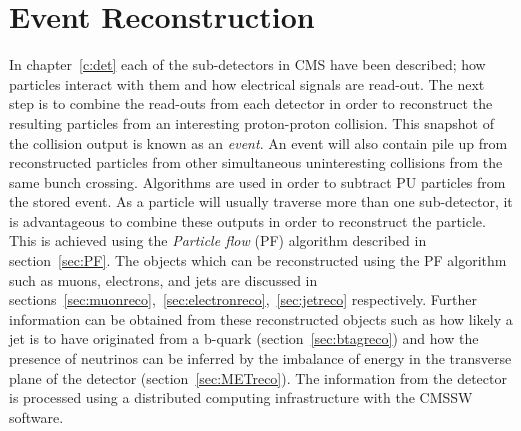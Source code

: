 \chapter{Event Reconstruction}
\label{c:recon}


In chapter~\ref{c:det} each of the sub-detectors in CMS have been described; how particles interact with them and how electrical signals are read-out. The next step is to combine the read-outs from each detector in order to reconstruct the resulting particles from an interesting proton-proton collision. This snapshot of the collision output is known as an \emph{event}. An event will also contain pile up from reconstructed particles from other simultaneous uninteresting collisions from the same bunch crossing. Algorithms are used in order to subtract PU particles from the stored event. 
As a particle will usually traverse more than one sub-detector, it is advantageous to combine these outputs in order to reconstruct the particle. This is achieved using the \emph{Particle flow} (PF) algorithm described in section~\ref{sec:PF}. The objects which can be reconstructed using the PF algorithm such as muons, electrons, and jets are discussed in sections~\ref{sec:muonreco},~\ref{sec:electronreco},~\ref{sec:jetreco} respectively. Further information can be obtained from these reconstructed objects such as how likely a jet is to have originated from a b-quark (section~\ref{sec:btagreco}) and how the presence of neutrinos can be inferred by the imbalance of energy in the transverse plane of the detector (section~\ref{sec:METreco}).  
The information from the detector is processed using a distributed computing infrastructure with the CMSSW software.




